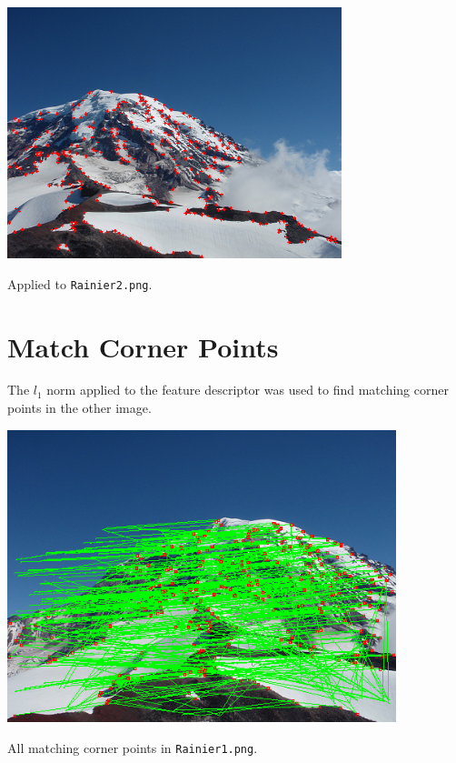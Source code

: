 \documentclass[letterpaper]{article}
\begin{document}
\begin{center}
  \includegraphics[width=0.73\textwidth]{1c.png}
  
  Applied to \texttt{Rainier2.png}.
\end{center}

\section{Match Corner Points}

The $l_1$ norm applied to the feature descriptor was used to find matching
corner points in the other image.

\begin{center}
  \includegraphics[width=0.85\textwidth]{2a.png}
  
  All matching corner points in \texttt{Rainier1.png}.
\end{center}
\end{document}
